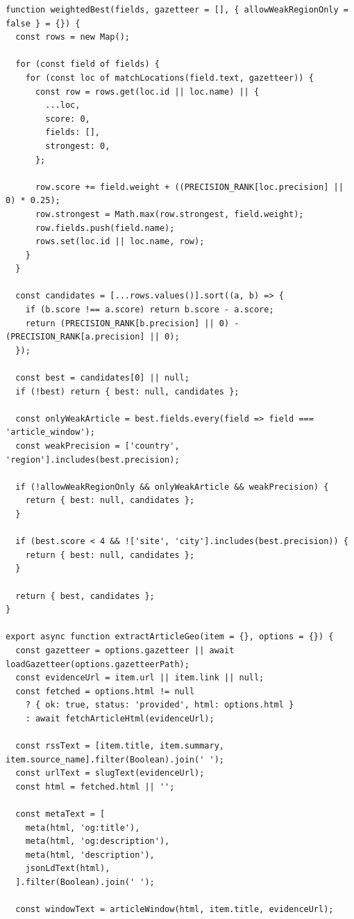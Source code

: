 ﻿\documentclass[12pt,a4paper]{article}
\begin{document}
\begin{lstlisting}[style=projectcode,caption={新闻地理位置抽取与地图定位增强}]
function weightedBest(fields, gazetteer = [], { allowWeakRegionOnly = false } = {}) {
  const rows = new Map();

  for (const field of fields) {
    for (const loc of matchLocations(field.text, gazetteer)) {
      const row = rows.get(loc.id || loc.name) || {
        ...loc,
        score: 0,
        fields: [],
        strongest: 0,
      };

      row.score += field.weight + ((PRECISION_RANK[loc.precision] || 0) * 0.25);
      row.strongest = Math.max(row.strongest, field.weight);
      row.fields.push(field.name);
      rows.set(loc.id || loc.name, row);
    }
  }

  const candidates = [...rows.values()].sort((a, b) => {
    if (b.score !== a.score) return b.score - a.score;
    return (PRECISION_RANK[b.precision] || 0) - (PRECISION_RANK[a.precision] || 0);
  });

  const best = candidates[0] || null;
  if (!best) return { best: null, candidates };

  const onlyWeakArticle = best.fields.every(field => field === 'article_window');
  const weakPrecision = ['country', 'region'].includes(best.precision);

  if (!allowWeakRegionOnly && onlyWeakArticle && weakPrecision) {
    return { best: null, candidates };
  }

  if (best.score < 4 && !['site', 'city'].includes(best.precision)) {
    return { best: null, candidates };
  }

  return { best, candidates };
}

export async function extractArticleGeo(item = {}, options = {}) {
  const gazetteer = options.gazetteer || await loadGazetteer(options.gazetteerPath);
  const evidenceUrl = item.url || item.link || null;
  const fetched = options.html != null
    ? { ok: true, status: 'provided', html: options.html }
    : await fetchArticleHtml(evidenceUrl);

  const rssText = [item.title, item.summary, item.source_name].filter(Boolean).join(' ');
  const urlText = slugText(evidenceUrl);
  const html = fetched.html || '';

  const metaText = [
    meta(html, 'og:title'),
    meta(html, 'og:description'),
    meta(html, 'description'),
    jsonLdText(html),
  ].filter(Boolean).join(' ');

  const windowText = articleWindow(html, item.title, evidenceUrl);


\end{lstlisting}
\end{document}
